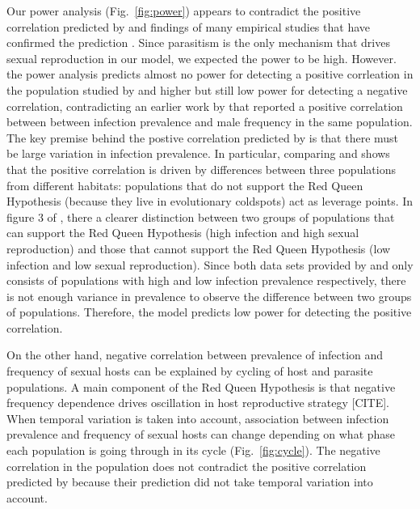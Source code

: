 \documentclass{article}\usepackage[]{graphicx}\usepackage[]{color}
\newcommand{\fref}[1]{Fig.~\ref{fig:#1}}
\begin{document}
Our power analysis (\fref{power}) appears to contradict the positive correlation predicted by \cite{lively1992parthenogenesis, lively2001trematode} and findings of many empirical studies that have confirmed the prediction \citep{lively1987evidence, lively2002temporal, kumpulainen2004parasites, vergara2013geographic, mckone2016fine}.
Since parasitism is the only mechanism that drives sexual reproduction in our model, we expected the power to be high.
However. the power analysis predicts almost no power for detecting a positive corrleation in the population studied by \cite{vergara2014infection} and higher but still low power for detecting a negative correlation, contradicting an earlier work by \cite{vergara2013geographic} that reported a positive correlation between between infection prevalence and male frequency in the same population.
The key premise behind the postive correlation predicted by \cite{lively2001trematode} is that there must be large variation in infection prevalence.
In particular, comparing \cite{vergara2013geographic} and \cite{vergara2014infection} shows that the positive correlation is driven by differences between three populations from different habitats:
populations that do not support the Red Queen Hypothesis (because they live in evolutionary coldspots) act as leverage points. 
In figure 3 of \cite{kumpulainen2004parasites}, there a clearer distinction between two groups of populations that can support the Red Queen Hypothesis (high infection and high sexual reproduction) and those that cannot support the Red Queen Hypothesis (low infection and low sexual reproduction).
Since both data sets provided by \cite{vergara2014infection} and \cite{mckone2016fine} only consists of populations with high and low infection prevalence respectively, there is not enough variance in prevalence to observe the difference between two groups of populations.
Therefore, the model predicts low power for detecting the positive correlation.

On the other hand, negative correlation between prevalence of infection and frequency of sexual hosts can be explained by cycling of host and parasite populations.
A main component of the Red Queen Hypothesis is that negative frequency dependence drives oscillation in host reproductive strategy [CITE].
When temporal variation is taken into account, association between infection prevalence and frequency of sexual hosts can change depending on what phase each population is going through in its cycle (\fref{cycle}).
The negative correlation in the population does not contradict the positive correlation predicted by \cite{lively2001trematode} because their prediction did not take temporal variation into account.
\end{document}
